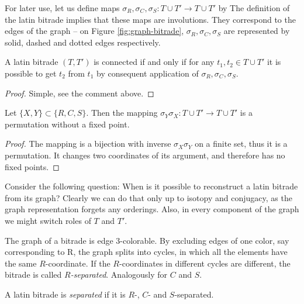 \noindent
For later use, let us define maps $\sigma_R, \sigma_C, \sigma_S : T \cup T' \rightarrow T \cup T'$ by
%
The definition of the latin bitrade implies that these maps are involutions. They correspond to the edges of the graph -- on Figure \ref{fig:graph-bitrade},  $\sigma_R, \sigma_C, \sigma_S$ are represented by solid, dashed and dotted edges respectively.

\begin{lem}
\label{lem:connected-sigma}
A latin bitrade $(T,T')$ is connected if and only if for any $t_1,t_2 \in T \cup T'$ it is possible to get $t_2$ from $t_1$ by consequent application of $\sigma_R, \sigma_C, \sigma_S$.
\end{lem}
\begin{proof}
Simple, see the comment above.
\end{proof}

\begin{lem}
\label{lem:sigma-cycles}
Let $\{X,Y\} \subset \{R,C,S\}$. Then the mapping $\sigma_Y\sigma_X : T \cup T' \rightarrow T \cup T'$ is a permutation without a fixed point.
\end{lem}
\begin{proof}
The mapping is a bijection with inverse $\sigma_X\sigma_Y$ on a finite set, thus it is a permutation. It changes two coordinates of its argument, and therefore has no fixed points.
\end{proof}

Consider the following question: When is it possible to reconstruct a latin bitrade from its graph? Clearly we can do that only up to isotopy and conjugacy, as the graph representation forgets any orderings. Also, in every component of the graph we might switch roles of $T$ and $T'$.

The graph of a bitrade is edge 3-colorable. By excluding edges of one color, say corresponding to  R, the graph splits into cycles, in which all the elements have the same $R$-coordinate. If the $R$-coordinates in different cycles are different, the bitrade is called \emph{$R$-separated}. Analogously for $C$ and $S$.

\begin{defn}
 A latin bitrade is \emph{separated} if it is $R$-, $C$- and $S$-separated.
\end{defn}


